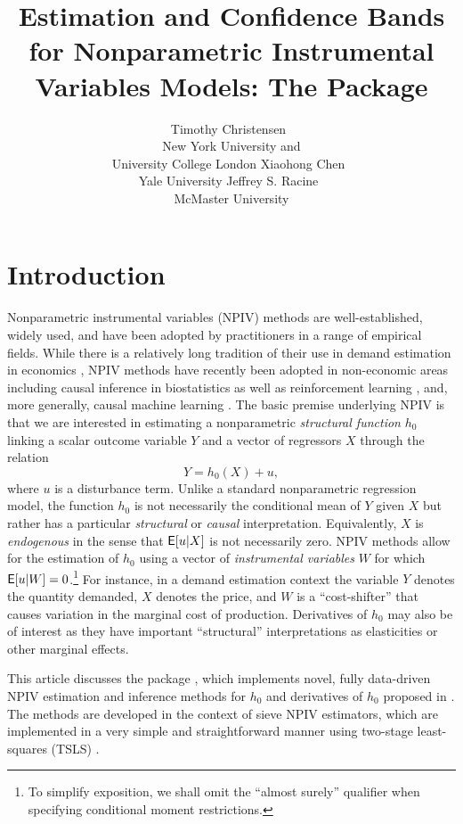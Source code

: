 \documentclass[
]{jss}
\author{
Timothy Christensen~\orcidlink{0000-0002-4639-5015}\\New York University
and\\
University College London \And Xiaohong
Chen~\orcidlink{0000-0003-1125-675X}\\Yale University \And Jeffrey S.
Racine~\orcidlink{0000-0002-5680-3705}\\McMaster University
}
\title{Estimation and Confidence Bands for Nonparametric Instrumental
Variables Models: The \proglang{R} Package \pkg{npiv}}
\begin{document}
\hypertarget{introduction}{%
\section{Introduction}\label{introduction}}

Nonparametric instrumental variables (NPIV) methods are
well-established, widely used, and have been adopted by practitioners in
a range of empirical fields. While there is a relatively long tradition
of their use in demand estimation in economics
\citep{BCK, BHP, BerryHaile2014}, NPIV methods have recently been
adopted in non-economic areas including causal inference in
biostatistics \citep{WangZhiTT2018} as well as reinforcement learning
\citep{grettonRL2021}, and, more generally, causal machine learning
\citep{causalML}. The basic premise underlying NPIV is that we are
interested in estimating a nonparametric \emph{structural function}
\(h_0\) linking a scalar outcome variable \(Y\) and a vector of
regressors \(X\) through the relation \begin{equation}\label{eq:npiv}
 Y = h_0(X) + u,
\end{equation} where \(u\) is a disturbance term. Unlike a standard
nonparametric regression model, the function \(h_0\) is not necessarily
the conditional mean of \(Y\) given \(X\) but rather has a particular
\emph{structural} or \emph{causal} interpretation. Equivalently, \(X\)
is \emph{endogenous} in the sense that \(\mathsf{E}[u|X]\) is not necessarily
zero. NPIV methods allow for the estimation of \(h_0\) using a vector of
\emph{instrumental variables} \(W\) for which
\(\mathsf{E}[u|W] = 0\).\footnote{To simplify exposition, we shall omit the
  ``almost surely'' qualifier when specifying conditional moment
  restrictions.} For instance, in a demand estimation context the
variable \(Y\) denotes the quantity demanded, \(X\) denotes the price,
and \(W\) is a ``cost-shifter'' that causes variation in the marginal
cost of production. Derivatives of \(h_0\) may also be of interest as
they have important ``structural'' interpretations as elasticities or
other marginal effects.

This article discusses the  package , which
implements novel, fully data-driven NPIV estimation and inference
methods for \(h_0\) and derivatives of \(h_0\) proposed in \citet{CCK}.
The methods are developed in the context of sieve NPIV estimators, which
are implemented in a very simple and straightforward manner using
two-stage least-squares (TSLS) \citep{AC, NP}.
\end{document}
